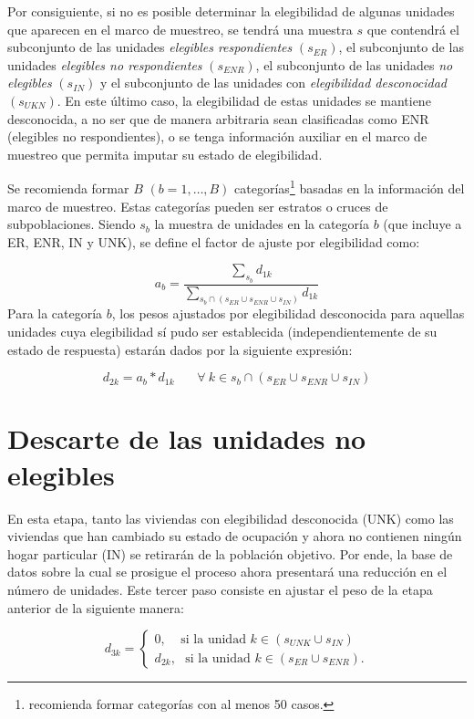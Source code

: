 \documentclass[
  12pt,
]{book}
\begin{document}
Por consiguiente, si no es posible determinar la elegibilidad de algunas unidades que aparecen en el marco de muestreo, se tendrá una muestra \(s\) que contendrá el subconjunto de las unidades \emph{elegibles respondientes} \((s_{ER})\), el subconjunto de las unidades \emph{elegibles no respondientes} \((s_{ENR})\), el subconjunto de las unidades \emph{no elegibles} \((s_{IN})\) y el subconjunto de las unidades con \emph{elegibilidad desconocidad} \((s_{UKN})\). En este último caso, la elegibilidad de estas unidades se mantiene desconocida, a no ser que de manera arbitraria sean clasificadas como ENR (elegibles no respondientes), o se tenga información auxiliar en el marco de muestreo que permita imputar su estado de elegibilidad.

Se recomienda formar \(B\) \((b = 1, \ldots, B)\) categorías\footnote{\citet{Valliant_Dever_2017} recomienda formar categorías con al menos 50 casos.} basadas en la información del marco de muestreo. Estas categorías pueden ser estratos o cruces de subpoblaciones. Siendo \(s_b\) la muestra de unidades en la categoría \(b\) (que incluye a ER, ENR, IN y UNK), se define el factor de ajuste por elegibilidad como:

\[
a_b = \frac{\sum_{s_b}d_{1k}}{\sum_{s_b \cap (s_{ER} \cup s_{ENR} \cup s_{IN})}d_{1k}}
\]
Para la categoría \(b\), los pesos ajustados por elegibilidad desconocida para aquellas unidades cuya elegibilidad sí pudo ser establecida (independientemente de su estado de respuesta) estarán dados por la siguiente expresión:

\[
d_{2k} = a_b * d_{1k}  \ \ \ \ \ \ \ \ \forall \ k\in s_b \cap (s_{ER} \cup s_{ENR} \cup s_{IN})
\]

\hypertarget{descarte-de-las-unidades-no-elegibles}{%
\section{Descarte de las unidades no elegibles}\label{descarte-de-las-unidades-no-elegibles}}

En esta etapa, tanto las viviendas con elegibilidad desconocida (UNK) como las viviendas que han cambiado su estado de ocupación y ahora no contienen ningún hogar particular (IN) se retirarán de la población objetivo. Por ende, la base de datos sobre la cual se prosigue el proceso ahora presentará una reducción en el número de unidades. Este tercer paso consiste en ajustar el peso de la etapa anterior de la siguiente manera:

\[
d_{3k} = 
\begin{cases}
0, \ \ \ \ \ \text{si la unidad $k \in (s_{UNK} \cup s_{IN})$ }\\
d_{2k},\ \ \ \text{si la unidad $k \in (s_{ER} \cup s_{ENR})$.}
\end{cases}
\]
\end{document}
